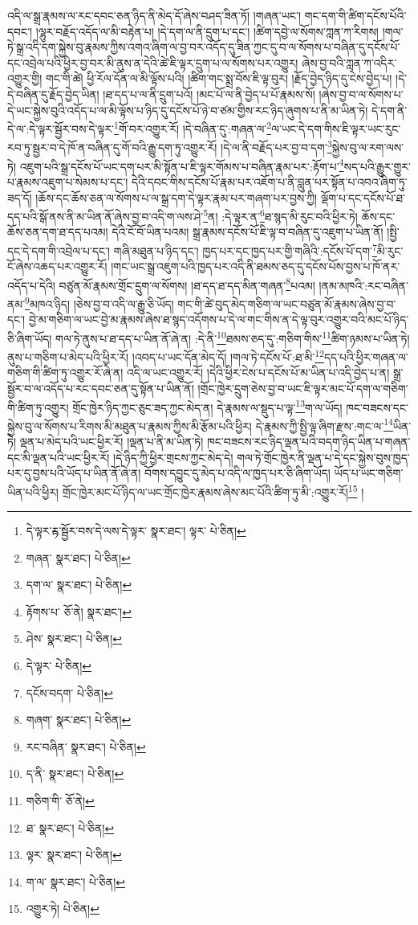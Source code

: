 འདི་ལ་སྒྲ་རྣམས་ལ་རང་དབང་ཅན་ཉིད་ནི་མེད་དོ་ཞེས་བཤད་ཟིན་ཏོ། །གཞན་ཡང་། གང་དག་གི་ཚིག་དངོས་པོའི་དབང་། །ལྷུར་བརྗོད་འདོད་ལ་མི་བརྟེན་པ། །དེ་དག་ལ་ནི་དྲུག་པ་དང་། །ཚིག་དབྱེ་ལ་སོགས་ཀླན་ཀ་རིགས། །གལ་ཏེ་སྒྲ་འདི་དག་སྐྱེས་བུ་རྣམས་ཀྱིས་འགའ་ཞིག་ལ་བྱ་བར་འདོད་དུ་ཟིན་ཀྱང་དུ་བ་ལ་སོགས་པ་བཞིན་དུ་དངོས་པོ་དང་འབྲེལ་པའི་ཕྱིར་བྱ་བར་མི་ནུས་ན་དེའི་ཚེ་ཇི་ལྟར་དྲུག་པ་ལ་སོགས་པར་འགྱུར། ཞེས་བྱ་བའི་ཀླན་ཀ་འདིར་འགྱུར་གྱི། གང་གི་ཚེ། ཕྱི་རོལ་དོན་ལ་མི་ལྟོས་པའི། །ཚིག་གང་སྨྲ་བོས་ཇི་ལྟ་བུར། །རྗོད་བྱེད་ཉིད་དུ་ངེས་བྱེད་པ། །དེ་དེ་བཞིན་དུ་རྗོད་བྱེད་ཡིན། །ཐ་དད་པ་ལ་ནི་དྲུག་པའོ། །མང་པོ་ལ་ནི་བྱེད་པ་པོ་རྣམས་སོ། །ཞེས་བྱ་བ་ལ་སོགས་པ་དེ་ཡང་སྐྱེས་བུའི་འདོད་པ་ལ་མི་ལྟོས་པ་ཉིད་དུ་དངོས་པོ་ཉེ་བ་ཙམ་གྱིས་རང་ཉིད་ཞུགས་པ་ནི་མ་ཡིན་ཏེ། དེ་དག་ནི་དེ་ལ་:དེ་ལྟར་སྦྱོར་བས་དེ་ལྟར་\footnote{དེ་ལྟར་ྟར་སྦྱོར་བས་དེ་ལས་དེ་ལྟར་  སྣར་ཐང་། ལྟར་  པེ་ཅིན། }གོ་བར་འགྱུར་རོ། །དེ་བཞིན་དུ་:གཞན་ལ་\footnote{གཞན་  སྣར་ཐང་།  པེ་ཅིན། }ལ་ཡང་དེ་དག་གིས་ཇི་ལྟར་ཡང་རུང་རབ་ཏུ་སྦྱར་བ་དེ་ཁོ་ན་བཞིན་དུ་གོ་བའི་རྒྱུ་དག་ཏུ་འགྱུར་རོ། །དེ་ལ་ནི་བརྗོད་པར་བྱ་བ་དག་\footnote{དག་ལ་  སྣར་ཐང་།  པེ་ཅིན། }སྐྱེས་བུ་ལ་རག་ལས་ཏེ། འཇུག་པའི་སྒྲ་དངོས་པོ་ཡང་དག་པར་མི་སྟོན་པ་ཇི་ལྟར་གོམས་པ་བཞིན་རྣམ་པར་:རྟོག་པ་\footnote{རྟོགས་པ་  ཅོ་ནེ།  སྣར་ཐང་། }སད་པའི་རྒྱུར་གྱུར་པ་རྣམས་འཇུག་པ་སེམས་པ་དང་། དེའི་དབང་གིས་དངོས་པོ་རྣམ་པར་འཇོག་པ་ནི་བླུན་པར་སྟོན་པ་འབའ་ཞིག་ཏུ་ཟད་དོ། །ཆོས་དང་ཆོས་ཅན་ལ་སོགས་པ་ལ་སྒྲ་དག་དེ་ལྟར་རྣམ་པར་གཞག་པར་བྱས་ཀྱི། ལྡོག་པ་དང་དངོས་པོ་ཐ་དད་པའི་སྒོ་ནས་ནི་མ་ཡིན་ནོ་ཞེས་བྱ་བ་འདི་ག་ལས་ཤེ་\footnote{ཤེས་  སྣར་ཐང་།  པེ་ཅིན། }ན། :དེ་ལྟར་ན་\footnote{དེ་ལྟར་  པེ་ཅིན། }ཐ་སྙད་མི་རུང་བའི་ཕྱིར་ཏེ། ཆོས་དང་ཆོས་ཅན་དག་ཐ་དད་པའམ། དེའི་ངོ་བོ་ཡིན་པའམ། སྒྲ་རྣམས་དངོས་པོ་ཇི་ལྟ་བ་བཞིན་དུ་འཇུག་པ་ཡིན་ནོ། །སྤྱི་དང་དེ་དག་གི་འབྲེལ་པ་དང་། གཞི་མཐུན་པ་ཉིད་དང་། ཁྱད་པར་དང་ཁྱད་པར་གྱི་གཞིའི་:དངོས་པོ་དག་\footnote{དངོས་བདག་  པེ་ཅིན། }མི་རུང་ངོ་ཞེས་འཆད་པར་འགྱུར་རོ། །གང་ཡང་སྒྲ་འཇུག་པའི་ཁྱད་པར་འདི་ནི་ཐམས་ཅད་དུ་དངོས་པོས་བྱས་པ་ཁོ་ནར་འདོད་པ་དེའི། བཙུན་མོ་རྣམས་གྲོང་དྲུག་ལ་སོགས། །ཐ་དད་ཐ་དད་མིན་གཞན་\footnote{གཞག་  སྣར་ཐང་།  པེ་ཅིན། }པའམ། །ནམ་མཁའི་:རང་བཞིན་ནམ་\footnote{རང་བཞིན་  སྣར་ཐང་།  པེ་ཅིན། }མཁའ་ཉིད། །ཅེས་བྱ་བ་འདི་ལ་རྒྱུ་ཅི་ཡོད། གང་གི་ཚེ་བུད་མེད་གཅིག་ལ་ཡང་བཙུན་མོ་རྣམས་ཞེས་བྱ་བ་དང་། བྱེ་མ་གཅིག་ལ་ཡང་བྱེ་མ་རྣམས་ཞེས་ཐ་སྙད་འདོགས་པ་དེ་ལ་གང་གིས་ན་དེ་ལྟ་བུར་འགྱུར་བའི་མང་པོ་ཉིད་ཅི་ཞིག་ཡོད། གལ་ཏེ་ནུས་པ་ཐ་དད་པ་ཡིན་ནོ་ཞེ་ན། :དེ་ནི་\footnote{ད་ནི་  སྣར་ཐང་།  པེ་ཅིན། }ཐམས་ཅད་དུ་:གཅིག་གིས་\footnote{གཅིག་གི་  ཅོ་ནེ། }ཚིག་ཉམས་པ་ཡིན་ཏེ། ནུས་པ་གཅིག་པ་མེད་པའི་ཕྱིར་རོ། །འབད་པ་ཡང་དོན་མེད་དོ། །གལ་ཏེ་དངོས་པོ་:ཐ་མི་\footnote{ཐ་  སྣར་ཐང་།  པེ་ཅིན། }དད་པའི་ཕྱིར་གཞན་ལ་གཅིག་གི་ཚིག་ཏུ་འགྱུར་རོ་ཞེ་ན། འདི་ལ་ཡང་འགྱུར་རོ། །དེའི་ཕྱིར་ངེས་པ་དངོས་པོ་མ་ཡིན་པ་འདི་བྱེད་པ་ན། སྒྲ་སྦྱོར་བ་ལ་འདོད་པ་རང་དབང་ཅན་དུ་སྟོན་པ་ཡིན་ནོ། །གྲོང་ཁྱེར་དྲུག་ཅེས་བྱ་བ་ཡང་ཇི་ལྟར་མང་པོ་དག་ལ་གཅིག་གི་ཚིག་ཏུ་འགྱུར། གྲོང་ཁྱེར་ཉིད་ཀྱང་ཅུང་ཟད་ཀྱང་མེད་ན། དེ་རྣམས་ལ་སྡུད་པ་ལྟ་\footnote{ལྟར་  སྣར་ཐང་།  པེ་ཅིན། }ག་ལ་ཡོད། ཁང་བཟངས་དང་སྐྱེས་བུ་ལ་སོགས་པ་རིགས་མི་མཐུན་པ་རྣམས་ཀྱིས་མི་རྩོམ་པའི་ཕྱིར། དེ་རྣམས་ཀྱི་སྤྱི་ལྟ་ཞིག་རྫས་:གང་ལ་\footnote{ག་ལ་  སྣར་ཐང་།  པེ་ཅིན། }ཡིན་ཏེ། ལྡན་པ་མེད་པའི་ཡང་ཕྱིར་རོ། །ལྡན་པ་ནི་མ་ཡིན་ཏེ། ཁང་བཟངས་རང་ཉིད་ལྡན་པའི་བདག་ཉིད་ཡིན་པ་གཞན་དང་མི་ལྡན་པའི་ཡང་ཕྱིར་རོ། །དེ་ཉིད་ཀྱི་ཕྱིར་གྲངས་ཀྱང་མེད་དེ། གལ་ཏེ་གྲོང་ཁྱེར་ནི་ལྡན་པ་དེ་དང་སྐྱེས་བུས་ཁྱད་པར་དུ་བྱས་པའི་ཡོད་པ་ཡིན་ནོ་ཞེ་ན། བོགས་དབྱུང་དུ་མེད་པ་འདི་ལ་ཁྱད་པར་ཅི་ཞིག་ཡོད། ཡོད་པ་ཡང་གཅིག་ཡིན་པའི་ཕྱིར། གྲོང་ཁྱེར་མང་པོ་ཉིད་ལ་ཡང་གྲོང་ཁྱེར་རྣམས་ཞེས་མང་པོའི་ཚིག་ཏུ་མི་:འགྱུར་རོ།\footnote{འགྱུར་ཏེ།  པེ་ཅིན། } །
